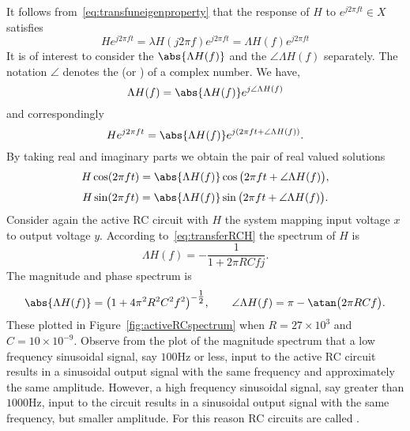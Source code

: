 It follows from~\eqref{eq:transfuneigenproperty} that the response of $H$ to $e^{j2\pi ft} \in X$ satisfies
\[
H e^{j 2\pi f t}  = \lambda H (j 2\pi f) e^{j 2\pi f t} = \Lambda H(f) e^{j 2\pi f t}
\]
It is of interest to consider the  $\abs{\Lambda H(f)}$ and the  $\angle{\Lambda H(f)}$ separately.  The notation $\angle$ denotes the  (or ) of a complex number.  We have,
\[
\Lambda H(f) = \abs{\Lambda H(f)} e^{j \angle{\Lambda H(f)}}
\]  
and correspondingly
\[
H e^{j 2\pi f t} = \abs{\Lambda H(f)} e^{j ( 2\pi f t + \angle{\Lambda H(f)})}.
\]
By taking real and imaginary parts we obtain the pair of real valued solutions
\[
H\cos(2\pi f t) = \abs{\Lambda H (f)} \cos\big(2\pi f t + \angle{\Lambda H(f)}\big),
\]
\begin{equation}\label{eq:spectrumrealvaluedsinsolution}
H \sin(2\pi f t)  = \abs{\Lambda H(f)} \sin\big(2\pi f t + \angle{\Lambda H(f)}\big).
\end{equation}
Consider again the active RC circuit with $H$ the system mapping input voltage $x$ to output voltage $y$.  According to~\eqref{eq:transferRCH} the spectrum of $H$ is
\begin{equation}\label{eq:specactiveRC}
\Lambda H(f) = -\frac{1}{1 + 2 \pi RC f j}.
\end{equation}
The magnitude and phase spectrum is
\[
\abs{\Lambda H(f)} = \big(1 + 4\pi^2 R^2 C^2 f^2\big)^{-\tfrac{1}{2}}, \qquad \angle \Lambda H(f) = \pi - \atan\big( 2\pi R C f \big).
\]
These plotted in Figure~\ref{fig:activeRCspectrum} when $R=27 \times 10^3$ and $C= 10 \times 10^{-9}$.  Observe from the plot of the magnitude spectrum that a low frequency sinusoidal signal, say $100\si{\hertz}$ or less, input to the active RC circuit results in a sinusoidal output signal with the same frequency and approximately the same amplitude.  However, a high frequency sinusoidal signal, say greater than $1000\si{\hertz}$, input to the circuit results in a sinusoidal output signal with the same frequency, but smaller amplitude.  For this reason RC circuits are called .


